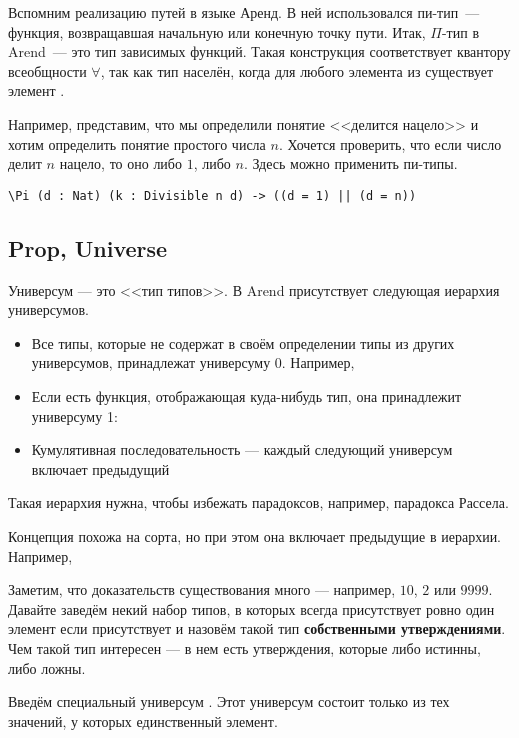 \medskip
Вспомним реализацию путей в языке Аренд. В ней использовался пи-тип~--- функция, возвращавшая начальную или конечную точку пути.
Итак, $\Pi$-тип в Arend~--- это тип зависимых функций. Такая конструкция соответствует квантору всеобщности $\forall$, так как
тип  населён, когда для любого элемента  из  существует элемент . 

Например, представим, что мы определили понятие <<делится нацело>> и хотим определить понятие простого числа $n$.
Хочется проверить, что если число делит $n$ нацело, то оно либо $1$, либо $n$. Здесь можно применить пи-типы.
\begin{verbatim}
\Pi (d : Nat) (k : Divisible n d) -> ((d = 1) || (d = n))
\end{verbatim}

\subsection{Prop, Universe}

Универсум --- это <<тип типов>>. В Arend присутствует следующая иерархия универсумов.

\begin{itemize}
    \item Все типы, которые не содержат в своём определении типы из других универсумов, принадлежат универсуму 0. Например, 
    \item Если есть функция, отображающая куда-нибудь тип, она принадлежит универсуму 1: 
    \item Кумулятивная последовательность --- каждый следующий универсум включает предыдущий
\end{itemize}

Такая иерархия нужна, чтобы избежать парадоксов, например, парадокса Рассела.

Концепция похожа на сорта, но при этом она включает предыдущие в иерархии. Например, 

\medskip
Заметим, что доказательств существования  много --- например, $10$, $2$ или $9999$.
Давайте заведём некий набор типов, в которых всегда присутствует ровно один элемент если присутствует и назовём такой тип \textbf{собственными утверждениями}.
Чем такой тип интересен --- в нем есть утверждения, которые либо истинны, либо ложны.

Введём специальный универсум . Этот универсум состоит только из тех значений, у которых единственный элемент.

